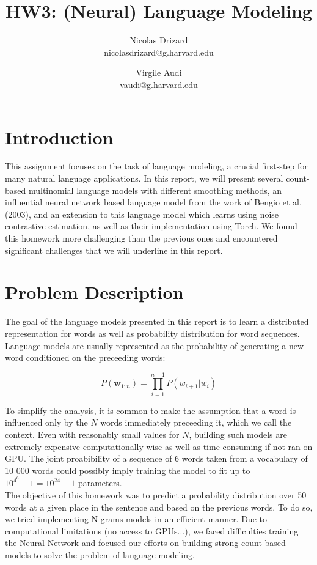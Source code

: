 \documentclass[11pt]{article}
\title{HW3: (Neural) Language Modeling}
\author{Nicolas Drizard \\ nicolasdrizard@g.harvard.edu \and Virgile Audi \\ vaudi@g.harvard.edu }
\begin{document}
\maketitle{}
\section{Introduction}

This assignment focuses on the task of language modeling, a crucial first-step for many natural language applications. In this report, we will present several count-based multinomial language models with different smoothing methods, an influential neural network based language model from the work of Bengio et al. (2003), and an extension to this language model which learns using noise contrastive estimation, as well as their implementation using Torch. We found this homework more challenging than the previous ones and encountered significant challenges that we will underline in this report. 


\section{Problem Description}

The goal of the language models presented in this report is to learn a distributed representation for words as well as probability distribution for word sequences. Language models are usually represented as the probability of generating a new word conditioned on the preceeding words:

$$ P(\boldsymbol{w}_{1:n}) = \prod\limits_{i=1}^{n-1}P(w_{i+1}|w_i)$$

\noindent To simplify the analysis, it is common to make the assumption that a word is influenced only by the $N$ words immediately preceeding it, which we call the context. Even with reasonably small values for $N$, building such models are extremely expensive computationally-wise as well as time-consuming if not ran on GPU. The joint proabibility of a sequence of 6 words taken from a vocabulary of 10 000 words could possibly imply training the model to fit up to $10^{4^6}-1 =10^{24}-1$ parameters.\\

\noindent The objective of this homework was to predict a probability distribution over 50 words at a given place in the sentence and based on the previous words.
To do so, we tried implementing N-grams models in an efficient manner. Due to computational limitations (no access to GPUs...), we faced difficulties training the Neural Network and focused our efforts on building strong count-based models to solve the problem of language modeling.
\end{document}

